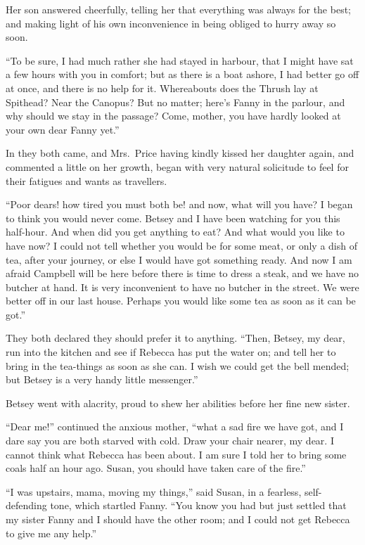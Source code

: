 Her son answered cheerfully, telling her that everything
was always for the best; and making light of his own
inconvenience in being obliged to hurry away so soon.

``To be sure, I had much rather she had stayed in harbour,
that I might have sat a few hours with you in comfort;
but as there is a boat ashore, I had better go off at once,
and there is no help for it.  Whereabouts does the Thrush
lay at Spithead?  Near the Canopus?  But no matter;
here's Fanny in the parlour, and why should we stay in
the passage?  Come, mother, you have hardly looked at your
own dear Fanny yet.''

In they both came, and Mrs.\ Price having kindly kissed
her daughter again, and commented a little on her growth,
began with very natural solicitude to feel for their
fatigues and wants as travellers.

``Poor dears! how tired you must both be! and now,
what will you have?  I began to think you would never come.
Betsey and I have been watching for you this half-hour.
And when did you get anything to eat?  And what would you
like to have now?  I could not tell whether you would be
for some meat, or only a dish of tea, after your journey,
or else I would have got something ready.  And now I
am afraid Campbell will be here before there is time
to dress a steak, and we have no butcher at hand.
It is very inconvenient to have no butcher in the street.
We were better off in our last house.  Perhaps you would
like some tea as soon as it can be got.''

They both declared they should prefer it to anything.
``Then, Betsey, my dear, run into the kitchen and see if Rebecca
has put the water on; and tell her to bring in the tea-things
as soon as she can.  I wish we could get the bell mended;
but Betsey is a very handy little messenger.''

Betsey went with alacrity, proud to shew her abilities
before her fine new sister.

``Dear me!'' continued the anxious mother, ``what a sad
fire we have got, and I dare say you are both starved
with cold.  Draw your chair nearer, my dear.  I cannot
think what Rebecca has been about.  I am sure I told her
to bring some coals half an hour ago.  Susan, you should
have taken care of the fire.''

``I was upstairs, mama, moving my things,'' said Susan,
in a fearless, self-defending tone, which startled Fanny.
``You know you had but just settled that my sister Fanny
and I should have the other room; and I could not get
Rebecca to give me any help.''

